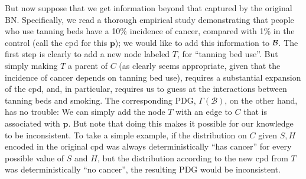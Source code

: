 \documentclass{article}
\theoremstyle{plain}
\theoremstyle{definition}
\newenvironment{example}
	{\pushQED{\qed}\renewcommand{\qedsymbol}{$\triangle$}\examplex}
	{\popQED\endexamplex%
}
\theoremstyle{remark}
\newcommand\mat[1]{\mathbf{#1}}
\newcommand\PDGof{\Gamma}
\numberwithin{equation}{section}
\begin{document}
\begin{example}[emulating a BN]
        But now suppose that we get information beyond that captured by the
original BN.  Specifically, we read a thorough empirical study 
        demonstrating that people who use tanning beds have a
                10\% incidence of cancer, compared with 1\% in the
                control (call the cpd for this $\mat p$); we would
                like to add this information to $\cal B$.  
		The first step is clearly to add a new node labeled
                $T$, for ``tanning bed use''.  But simply making $T$ a
                parent of $C$ (as clearly seems appropriate, given
                that 
                the incidence of cancer depends on tanning bed use),
                requires a substantial expansion of the cpd, and, in
                particular, requires us to guess at the interactions
                between tanning beds and smoking.  
%		
		The corresponding PDG, $\PDGof(\mathcal B)$, on the other hand, has no trouble:
		We can simply add the node $T$ with an edge to $C$ that is associated with $\mat p$. 
%		
                But note that doing this makes it possible for our
                knowledge to be 
                inconsistent. To take a simple example, if the
                distribution on $C$ 
                given $S,H$ encoded in the original cpd was always
                deterministically ``has cancer'' for every possible
                value of $S$ and $H$, but the distribution according
                to the new cpd from $T$ was deterministically ``no
                cancer'', the resulting PDG would be inconsistent.  
%

\end{example}
\end{document}
